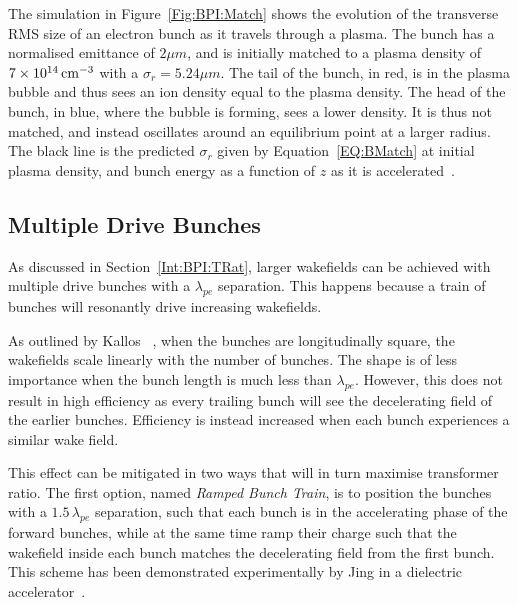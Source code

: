 The simulation in Figure~\ref{Fig:BPI:Match} shows the evolution of the transverse RMS size of an electron bunch as it travels through a plasma.
The bunch has a normalised emittance of $2\unit{\mu m}$, and is initially matched to a plasma density of $7\times 10^{14}\,\mathrm{cm}^{-3}$ with a $\sigma_{r} = 5.24\unit{\mu m}$.
The tail of the bunch, in red, is in the plasma bubble and thus sees an ion density equal to the plasma density.
The head of the bunch, in blue, where the bubble is forming, sees a lower density.
It is thus not matched, and instead oscillates around an equilibrium point at a larger radius.
The black line is the predicted $\sigma_{r}$ given by Equation~\ref{EQ:BMatch} at initial plasma density, and bunch energy as a function of $z$ as it is accelerated~\cite{berglyd_olsen:2018}.

\subsection{Multiple Drive Bunches}
\label{Int:BPI:Multi}

As discussed in Section~\ref{Int:BPI:TRat}, larger wakefields can be achieved with multiple drive bunches with a $\lambda_{pe}$ separation.
This happens because a train of bunches will resonantly drive increasing wakefields.

As outlined by Kallos \etal~\cite{kallos:2007}, when the bunches are longitudinally square, the wakefields scale linearly with the number of bunches.
The shape is of less importance when the bunch length is much less than $\lambda_{pe}$.
However, this does not result in high efficiency as every trailing bunch will see the decelerating field of the earlier bunches.
Efficiency is instead increased when each bunch experiences a similar wake field.

This effect can be mitigated in two ways that will in turn maximise transformer ratio.
The first option, named \textit{Ramped Bunch Train}, is to position the bunches with a $1.5\,\lambda_{pe}$ separation, such that each bunch is in the accelerating phase of the forward bunches, while at the same time ramp their charge such that the wakefield inside each bunch matches the decelerating field from the first bunch.
This scheme has been demonstrated experimentally by Jing \etal in a dielectric accelerator~\cite{jing:2006,jing:2007}.


